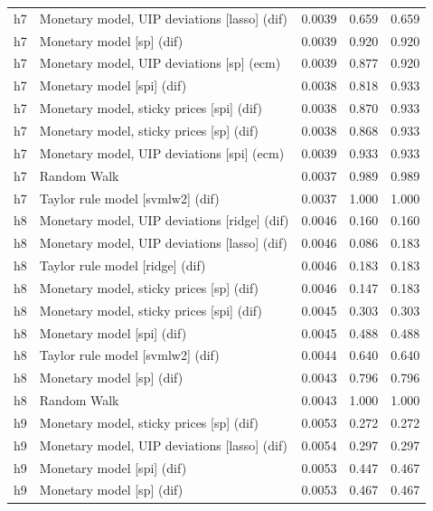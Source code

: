 \begin{ThreePartTable}
\begin{longtable}[t]{cp{5.5cm}ccc}
h7 & \raggedright Monetary model, UIP deviations [lasso] (dif) & 0.0039 & 0.659 & 0.659\\
h7 & \raggedright Monetary model [sp] (dif) & 0.0039 & 0.920 & 0.920\\
h7 & \raggedright Monetary model, UIP deviations [sp] (ecm) & 0.0039 & 0.877 & 0.920\\
h7 & \raggedright Monetary model [spi] (dif) & 0.0038 & 0.818 & 0.933\\
h7 & \raggedright Monetary model, sticky prices [spi] (dif) & 0.0038 & 0.870 & 0.933\\
h7 & \raggedright Monetary model, sticky prices [sp] (dif) & 0.0038 & 0.868 & 0.933\\
h7 & \raggedright Monetary model, UIP deviations [spi] (ecm) & 0.0039 & 0.933 & 0.933\\
h7 & \raggedright Random Walk & 0.0037 & 0.989 & 0.989\\
h7 & \raggedright Taylor rule model [svmlw2] (dif) & 0.0037 & 1.000 & 1.000\\
\addlinespace
h8 & \raggedright Monetary model, UIP deviations [ridge] (dif) & 0.0046 & 0.160 & 0.160\\
h8 & \raggedright Monetary model, UIP deviations [lasso] (dif) & 0.0046 & 0.086 & 0.183\\
h8 & \raggedright Taylor rule model [ridge] (dif) & 0.0046 & 0.183 & 0.183\\
h8 & \raggedright Monetary model, sticky prices [sp] (dif) & 0.0046 & 0.147 & 0.183\\
h8 & \raggedright Monetary model, sticky prices [spi] (dif) & 0.0045 & 0.303 & 0.303\\
h8 & \raggedright Monetary model [spi] (dif) & 0.0045 & 0.488 & 0.488\\
h8 & \raggedright Taylor rule model [svmlw2] (dif) & 0.0044 & 0.640 & 0.640\\
h8 & \raggedright Monetary model [sp] (dif) & 0.0043 & 0.796 & 0.796\\
h8 & \raggedright Random Walk & 0.0043 & 1.000 & 1.000\\
\addlinespace
h9 & \raggedright Monetary model, sticky prices [sp] (dif) & 0.0053 & 0.272 & 0.272\\
h9 & \raggedright Monetary model, UIP deviations [lasso] (dif) & 0.0054 & 0.297 & 0.297\\
h9 & \raggedright Monetary model [spi] (dif) & 0.0053 & 0.447 & 0.467\\
h9 & \raggedright Monetary model [sp] (dif) & 0.0053 & 0.467 & 0.467\\

\end{longtable}
\end{ThreePartTable}
